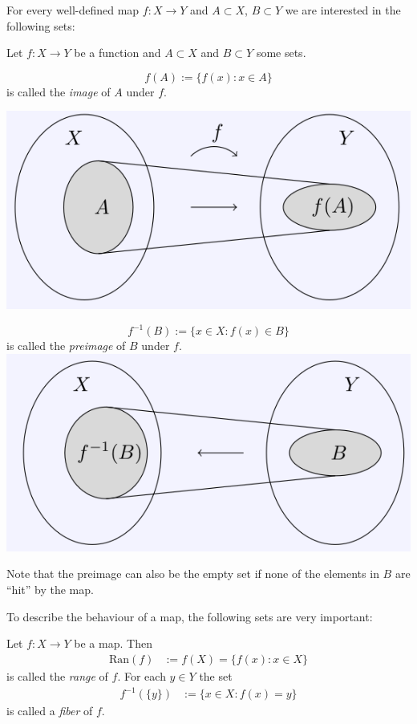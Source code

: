 


For every well-defined map $f: X\to Y$ and $A\subset X$, $B \subset Y$ we are interested in the following sets:
\begin{Definition}{} 
Let $f: X\rightarrow Y$ be a function and $A\subset X$ and $B\subset Y$ some sets.

$$f(A):= \{ f(x): x\in A\}$$ 
is called the \emph{image} of $A$ under $f$.

\includegraphics{./image.png}
 
$$f^{-1}(B):= \{ x\in X: f(x) \in B \}$$ is called the \emph{preimage} of $B$ under $f$.
\includegraphics{./preimage.png}

\end{Definition}
%
Note that the preimage can also be the empty set if none of the
elements in $B$ are ``hit'' by the map.

To describe the behaviour of a map,
the following sets are very important:

\begin{Definition}
Let $f: X\rightarrow Y$ be a map. Then
\begin{align*}
 \mathrm{Ran}(f) &:= f(X) = \{ f(x) : x \in X \} 
\end{align*}
is called the \emph{range} of $f$.
For each $y\in Y$ the set
\begin{align*}
 f^{-1}(\{y \}) &:= \{ x \in X : f(x) = y \} 
\end{align*}
is called a \emph{fiber} of $f$.
\end{Definition}
